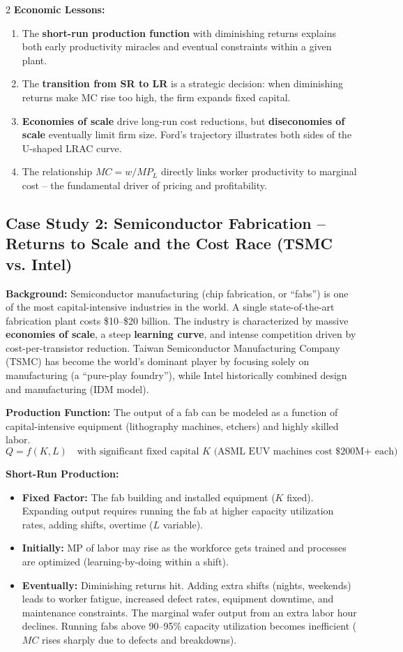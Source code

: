 \documentclass[10pt,a4paper]{article}
\begin{document}
\begin{multicols}{2}
\textbf{Economic Lessons:}
\begin{enumerate}[leftmargin=*,nosep]
    \item The \textbf{short-run production function} with diminishing returns explains both early productivity miracles and eventual constraints within a given plant.
    \item The \textbf{transition from SR to LR} is a strategic decision: when diminishing returns make MC rise too high, the firm expands fixed capital.
    \item \textbf{Economies of scale} drive long-run cost reductions, but \textbf{diseconomies of scale} eventually limit firm size. Ford's trajectory illustrates both sides of the U-shaped LRAC curve.
    \item The relationship $MC = w/MP_L$ directly links worker productivity to marginal cost -- the fundamental driver of pricing and profitability.
\end{enumerate}

\subsection*{Case Study 2: Semiconductor Fabrication -- Returns to Scale and the Cost Race (TSMC vs. Intel)}

\textbf{Background:} Semiconductor manufacturing (chip fabrication, or ``fabs'') is one of the most capital-intensive industries in the world. A single state-of-the-art fabrication plant costs \$10--\$20 billion. The industry is characterized by massive \textbf{economies of scale}, a steep \textbf{learning curve}, and intense competition driven by cost-per-transistor reduction. Taiwan Semiconductor Manufacturing Company (TSMC) has become the world's dominant player by focusing solely on manufacturing (a ``pure-play foundry''), while Intel historically combined design and manufacturing (IDM model).

\textbf{Production Function:}
The output of a fab can be modeled as a function of capital-intensive equipment (lithography machines, etchers) and highly skilled labor.
\[
Q = f(K, L) \quad \text{with significant fixed capital } K \text{ (ASML EUV machines cost \$200M+ each)}
\]

\textbf{Short-Run Production:}
\begin{itemize}[leftmargin=*,nosep]
    \item \textbf{Fixed Factor:} The fab building and installed equipment ($K$ fixed). Expanding output requires running the fab at higher capacity utilization rates, adding shifts, overtime ($L$ variable).
    \item \textbf{Initially:} MP of labor may rise as the workforce gets trained and processes are optimized (learning-by-doing within a shift).
    \item \textbf{Eventually:} Diminishing returns hit. Adding extra shifts (nights, weekends) leads to worker fatigue, increased defect rates, equipment downtime, and maintenance constraints. The marginal wafer output from an extra labor hour declines. Running fabs above 90--95\% capacity utilization becomes inefficient ($MC$ rises sharply due to defects and breakdowns).
\end{itemize}


\end{multicols}
\end{document}
